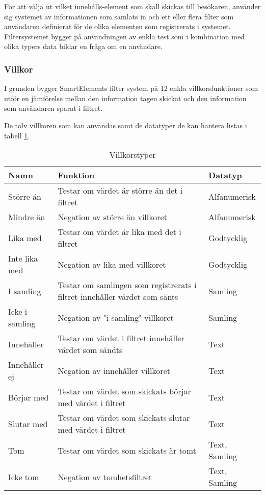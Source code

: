 
För att välja ut vilket innehålls-element som skall skickas till besökaren, använder sig systemet av informationen som samlats in och ett eller flera filter som användaren definierat för de olika elementen som registrerats i systemet. Filtersystemet bygger på användningen av enkla test som i kombination med olika typers data bildar en fråga om en användare.

\subsubsection{Villkor}

I grunden bygger SmartElements filter system på 12 enkla villkorsfunktioner som utför en jämförelse mellan den information tagen skickat och den information som användaren sparat i filtret.

De tolv villkoren som kan användas samt de datatyper de kan hantera listas i tabell \ref{table:villkor}.

\begin{table}
    \begin{tabular}{|l|p{8cm}|l|}
    \hline
    Namn & Funktion & Datatyp \\
    \hline
    Större än & Testar om värdet är större än det i filtret & Alfanumerisk \\
    \hline
    Mindre än & Negation av större än villkoret & Alfanumerisk \\
    \hline
    Lika med & Testar om värdet är lika med det i filtret & Godtycklig \\
    \hline
    Inte lika med & Negation av lika med villkoret & Godtycklig \\
    \hline
    I samling & Testar om samlingen som registrerats i filtret innehåller värdet som sänts & Samling \\
    \hline
    Icke i samling & Negation av "i samling" villkoret & Samling \\
    \hline
    Innehåller & Testar om värdet i filtret innehåller värdet som sändts & Text \\
    \hline
    Innehåller ej & Negation av innehåller villkoret & Text \\
    \hline
    Börjar med & Testar om värdet som skickats börjar med värdet i filtret & Text \\
    \hline
    Slutar med & Testar om värdet som skickats slutar med värdet i filtret & Text \\
    \hline
    Tom & Testar om värdet som skickats är tomt & Text, Samling \\
    \hline
    Icke tom & Negation av tomhetsfiltret & Text, Samling \\
    \hline
    \end{tabular}
    \caption{Villkorstyper}
    \label{table:villkor}
\end{table}

